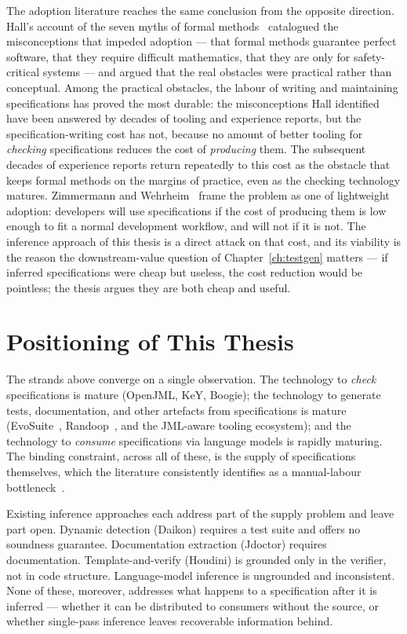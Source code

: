 The adoption literature reaches the same conclusion from the opposite
direction. Hall's account of the seven myths of formal
methods~\cite{hall1990seven} catalogued the misconceptions that impeded adoption
--- that formal methods guarantee perfect software, that they require difficult
mathematics, that they are only for safety-critical systems --- and argued that
the real obstacles were practical rather than conceptual. Among the practical
obstacles, the labour of writing and maintaining specifications has proved the
most durable: the misconceptions Hall identified have been answered by decades of
tooling and experience reports, but the specification-writing cost has not, because
no amount of better tooling for \emph{checking} specifications reduces the cost of
\emph{producing} them. The subsequent decades of experience reports return
repeatedly to this cost as the obstacle that keeps formal methods on the margins of
practice, even as the checking technology matures. Zimmermann and Wehrheim~\cite{zimmermann2019lightweight}
frame the problem as one of lightweight adoption: developers will use
specifications if the cost of producing them is low enough to fit a normal
development workflow, and will not if it is not. The inference approach of this
thesis is a direct attack on that cost, and its viability is the reason the
downstream-value question of Chapter~\ref{ch:testgen} matters --- if inferred
specifications were cheap but useless, the cost reduction would be pointless;
the thesis argues they are both cheap and useful.

\section{Positioning of This Thesis}
\label{sec:bg-positioning}

The strands above converge on a single observation. The technology to
\emph{check} specifications is mature (OpenJML, KeY, Boogie); the technology to
generate tests, documentation, and other artefacts from specifications is
mature (EvoSuite~\cite{fraser2011evosuite}, Randoop~\cite{pacheco2007randoop},
and the JML-aware tooling ecosystem); and the technology to \emph{consume}
specifications via language models is rapidly maturing. The binding
constraint, across all of these, is the supply of specifications themselves,
which the literature consistently identifies as a manual-labour
bottleneck~\cite{matichuk_cost_2015, zimmermann2019lightweight, hall1990seven}.

Existing inference approaches each address part of the supply problem and
leave part open. Dynamic detection (Daikon) requires a test suite and offers
no soundness guarantee. Documentation extraction (Jdoctor) requires
documentation. Template-and-verify (Houdini) is grounded only in the verifier,
not in code structure. Language-model inference is ungrounded and
inconsistent. None of these, moreover, addresses what happens to a
specification after it is inferred --- whether it can be distributed to
consumers without the source, or whether single-pass inference leaves
recoverable information behind.

